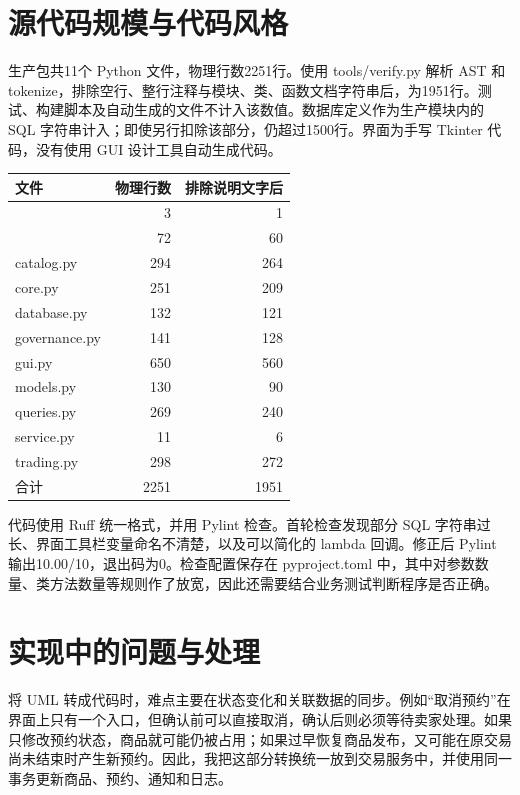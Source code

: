 \documentclass[11pt,a4paper]{ctexart}
\begin{document}
\section{源代码规模与代码风格}
生产包共11个 Python 文件，物理行数2251行。使用 tools/verify.py 解析 AST 和 tokenize，排除空行、整行注释与模块、类、函数文档字符串后，为1951行。测试、构建脚本及自动生成的文件不计入该数值。数据库定义作为生产模块内的 SQL 字符串计入；即使另行扣除该部分，仍超过1500行。界面为手写 Tkinter 代码，没有使用 GUI 设计工具自动生成代码。

\begin{tabularx}{\textwidth}{Yrr}
\toprule 文件 & 物理行数 & 排除说明文字后\\\midrule
\texttt{} &3&1\\
\texttt{} &72&60\\
catalog.py &294&264\\
core.py &251&209\\
database.py &132&121\\
governance.py &141&128\\
gui.py &650&560\\
models.py &130&90\\
queries.py &269&240\\
service.py &11&6\\
trading.py &298&272\\\midrule
合计 &2251&1951\\\bottomrule
\end{tabularx}

代码使用 Ruff 统一格式，并用 Pylint 检查。首轮检查发现部分 SQL 字符串过长、界面工具栏变量命名不清楚，以及可以简化的 lambda 回调。修正后 Pylint 输出10.00/10，退出码为0。检查配置保存在 pyproject.toml 中，其中对参数数量、类方法数量等规则作了放宽，因此还需要结合业务测试判断程序是否正确。

\section{实现中的问题与处理}
将 UML 转成代码时，难点主要在状态变化和关联数据的同步。例如“取消预约”在界面上只有一个入口，但确认前可以直接取消，确认后则必须等待卖家处理。如果只修改预约状态，商品就可能仍被占用；如果过早恢复商品发布，又可能在原交易尚未结束时产生新预约。因此，我把这部分转换统一放到交易服务中，并使用同一事务更新商品、预约、通知和日志。
\end{document}
